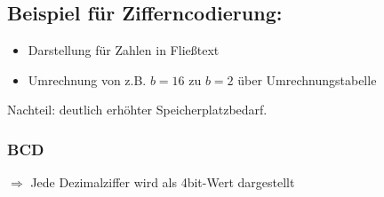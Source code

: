 \documentclass[10pt,a4paper]{scrartcl}
\begin{document}
\subsection{Beispiel für Zifferncodierung:}
\begin{itemize}
	\item {} Darstellung für Zahlen in Fließtext
	\item Umrechnung von z.B. $ b=16 $ zu $ b=2 $ über Umrechnungstabelle
\end{itemize}
 Nachteil: deutlich erhöhter Speicherplatzbedarf.

\subsubsection{\acf{BCD}}
\hspace*{2em} $\Rightarrow$ Jede Dezimalziffer wird als 4bit-Wert dargestellt\\
\end{document}
